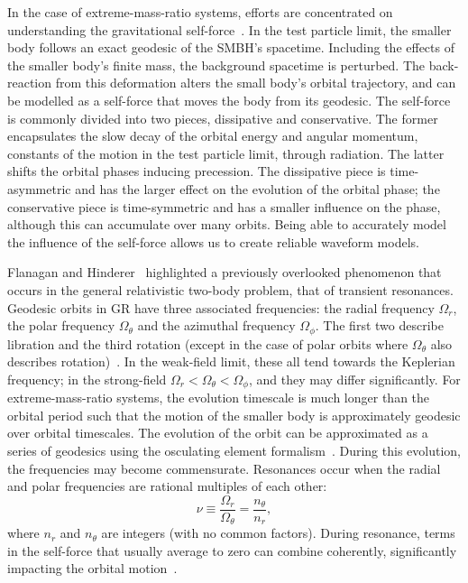 \documentclass[aps,prd,amsfonts,amssymb,amsmath,nofootinbib,showpacs,superscriptaddress,twocolumn]{revtex4}
\begin{document}
In the case of extreme-mass-ratio systems, efforts are concentrated on understanding the gravitational self-force~\cite{Barack2009,Poisson2004}. In the test particle limit, the smaller body follows an exact geodesic of the SMBH's spacetime. Including the effects of the smaller body's finite mass, the background spacetime is perturbed. The back-reaction from this deformation alters the small body's orbital trajectory, and can be modelled as a self-force that moves the body from its geodesic. The self-force is commonly divided into two pieces, dissipative and conservative. The former encapsulates the slow decay of the orbital energy and angular momentum, constants of the motion in the test particle limit, through radiation. The latter shifts the orbital phases inducing precession. The dissipative piece is time-asymmetric and has the larger effect on the evolution of the orbital phase; the conservative piece is time-symmetric and has a smaller influence on the phase, although this can accumulate over many orbits. Being able to accurately model the influence of the self-force allows us to create reliable waveform models.

Flanagan and Hinderer~\cite{Flanagan2012} highlighted a previously overlooked phenomenon that occurs in the general relativistic two-body problem, that of transient resonances. Geodesic orbits in GR have three associated frequencies: the radial frequency $\Omega_r$, the polar frequency $\Omega_\theta$ and the azimuthal frequency $\Omega_\phi$. The first two describe libration and the third rotation (except in the case of polar orbits where $\Omega_\theta$ also describes rotation)~\cite{Goldstein2002}. %
In the weak-field limit, these all tend towards the Keplerian frequency; in the strong-field $\Omega_r < \Omega_\theta < \Omega_\phi$, and they may differ significantly. For extreme-mass-ratio systems, the evolution timescale is much longer than the orbital period such that the motion of the smaller body is approximately geodesic over orbital timescales. The evolution of the orbit can be approximated as a series of geodesics using the osculating element formalism~\cite{Pound2008,Gair2011a}. During this evolution, the frequencies may become commensurate. Resonances occur when the radial and polar frequencies are rational multiples of each other:
\begin{equation}
\nu \equiv \frac{\Omega_r}{\Omega_\theta} = \frac{n_\theta}{n_r},
\end{equation}
where $n_r$ and $n_\theta$ are integers (with no common factors). During resonance, terms in the self-force that usually average to zero can combine coherently, significantly impacting the orbital motion~\cite{Flanagan2012a}.
\end{document}
